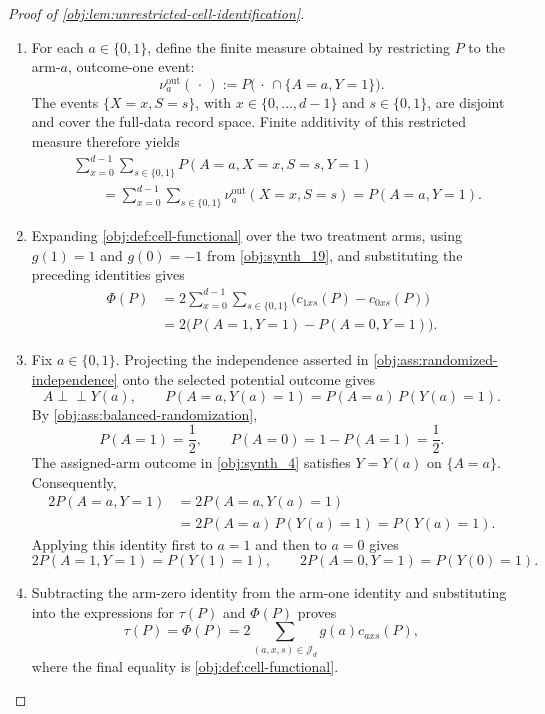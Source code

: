 \documentclass[11pt]{article}
\begin{document}
\begin{proof}[Proof of \cref{obj:lem:unrestricted-cell-identification}]
\begin{enumerate}
\item For each \(a\in\{0,1\}\), define the finite measure obtained by restricting \(P\) to the arm-\(a\), outcome-one event:
\[
\nu_a^{\mathrm{out}}(\,\cdot\,)
:=P\bigl(\,\cdot\,\cap\{A=a,Y=1\}\bigr).
\]
The events \(\{X=x,S=s\}\), with \(x\in\{0,\ldots,d-1\}\) and \(s\in\{0,1\}\), are disjoint and cover the full-data record space. Finite additivity of this restricted measure therefore yields
\[
\begin{aligned}
&\sum_{x=0}^{d-1}\sum_{s\in\{0,1\}}
P(A=a,X=x,S=s,Y=1)\\
&\qquad =
\sum_{x=0}^{d-1}\sum_{s\in\{0,1\}}
\nu_a^{\mathrm{out}}(X=x,S=s)
=P(A=a,Y=1).
\end{aligned}
\] %

\item Expanding \cref{obj:def:cell-functional} over the two treatment arms, using \(g(1)=1\) and \(g(0)=-1\) from \cref{obj:synth_19}, and substituting the preceding identities gives
\[
\begin{aligned}
\Phi(P)
&=2\sum_{x=0}^{d-1}\sum_{s\in\{0,1\}}
\bigl(c_{1xs}(P)-c_{0xs}(P)\bigr)\\
&=2\bigl(P(A=1,Y=1)-P(A=0,Y=1)\bigr).
\end{aligned}
\] %

\item Fix \(a\in\{0,1\}\). Projecting the independence asserted in
\cref{obj:ass:randomized-independence} onto the selected potential outcome gives
\[
A\perp\!\!\!\perp Y(a),
\qquad
P(A=a,Y(a)=1)=P(A=a)\,P(Y(a)=1).
\]
By \cref{obj:ass:balanced-randomization},
\[
P(A=1)=\frac12,
\qquad
P(A=0)=1-P(A=1)=\frac12.
\]
The assigned-arm outcome in \cref{obj:synth_4} satisfies \(Y=Y(a)\) on \(\{A=a\}\). Consequently,
\[
\begin{aligned}
2P(A=a,Y=1)
&=2P(A=a,Y(a)=1)\\
&=2P(A=a)\,P(Y(a)=1)
=P(Y(a)=1).
\end{aligned}
\]
Applying this identity first to \(a=1\) and then to \(a=0\) gives
\[
2P(A=1,Y=1)=P(Y(1)=1),
\qquad
2P(A=0,Y=1)=P(Y(0)=1).
\] %

\item Subtracting the arm-zero identity from the arm-one identity and substituting into the expressions for \(\tau(P)\) and \(\Phi(P)\) proves
\[
\tau(P)
=\Phi(P)
=2\sum_{(a,x,s)\in\mathcal J_d}g(a)c_{axs}(P),
\]
where the final equality is \cref{obj:def:cell-functional}. %
\end{enumerate}
\end{proof}
\end{document}
